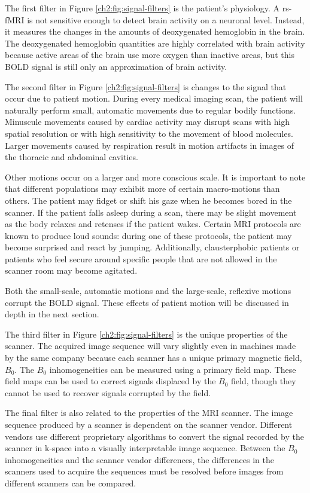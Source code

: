 The first filter in Figure \ref{ch2:fig:signal-filters} is the patient's physiology. A rs-fMRI is not sensitive enough to detect brain activity on a neuronal level. Instead, it measures the changes in the amounts of deoxygenated hemoglobin in the brain. The deoxygenated hemoglobin quantities are highly correlated with brain activity because active areas of the brain use more oxygen than inactive areas, but this BOLD signal is still only an approximation of brain activity.

The second filter in Figure \ref{ch2:fig:signal-filters} is changes to the signal that occur due to patient motion.
During every medical imaging scan, the patient will naturally perform small, automatic movements due to regular bodily functions. Minuscule movements caused by cardiac activity may disrupt scans with high spatial resolution or with high sensitivity to the movement of blood molecules. Larger movements caused by respiration result in motion artifacts in images of the thoracic and abdominal cavities. 

Other motions occur on a larger and more conscious scale. It is important to note that different populations may exhibit more of certain macro-motions than others. The patient may fidget or shift his gaze when he becomes bored in the scanner. If the patient falls asleep during a scan, there may be slight movement as the body relaxes and retenses if the patient wakes. Certain MRI protocols are known to produce loud sounds: during one of these protocols, the patient may become surprised and react by jumping. Additionally, clausterphobic patients or patients who feel secure around specific people that are not allowed in the scanner room may become agitated. 

Both the small-scale, automatic motions and the large-scale, reflexive motions corrupt the BOLD signal. These effects of patient motion will be discussed in depth in the next section.

The third filter in Figure \ref{ch2:fig:signal-filters} is the unique properties of the scanner. The acquired image sequence will vary slightly even in machines made by the same company because each scanner has a unique primary magnetic field, $B_0$. The $B_0$ inhomogeneities can be measured using a primary field map. These field maps can be used to correct signals displaced by the $B_0$ field, though they cannot be used to recover signals corrupted by the field.

The final filter is also related to the properties of the MRI scanner. The image sequence produced by a scanner is dependent on the scanner vendor. Different vendors use different proprietary algorithms to convert the signal recorded by the scanner in k-space into a visually interpretable image sequence. Between the $B_0$ inhomogeneities and the scanner vendor differences, the differences in the scanners used to acquire the sequences must be resolved before images from different scanners can be compared.

